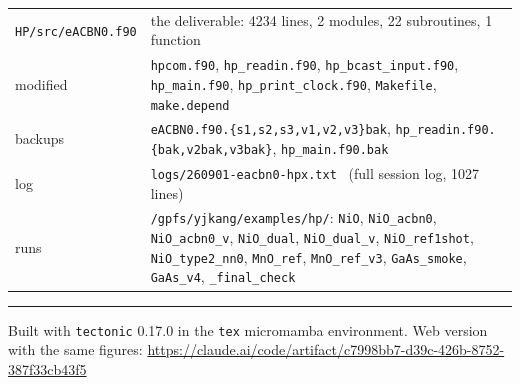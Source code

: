 \documentclass[11pt,a4paper]{article}
\newcommand{\C}[1]{\texttt{\small #1}}
\begin{document}
\begin{center}\small
\begin{tabularx}{\textwidth}{lX}
\toprule
\C{HP/src/eACBN0.f90} & the deliverable: 4234 lines, 2 modules, 22 subroutines, 1 function \\
modified & \C{hpcom.f90}, \C{hp_readin.f90}, \C{hp_bcast_input.f90},
           \C{hp_main.f90}, \C{hp_print_clock.f90}, \C{Makefile},
           \C{make.depend} \\
backups  & \C{eACBN0.f90.\{s1,s2,s3,v1,v2,v3\}bak},
           \C{hp_readin.f90.\{bak,v2bak,v3bak\}}, \C{hp_main.f90.bak} \\
log      & \C{logs/260901-eacbn0-hpx.txt} \ (full session log, 1027 lines) \\
runs     & \C{/gpfs/yjkang/examples/hp/}: \C{NiO}, \C{NiO_acbn0},
           \C{NiO_acbn0_v}, \C{NiO_dual}, \C{NiO_dual_v}, \C{NiO_ref1shot},
           \C{NiO_type2_nn0}, \C{MnO_ref}, \C{MnO_ref_v3}, \C{GaAs_smoke},
           \C{GaAs_v4}, \C{_final_check} \\
\bottomrule
\end{tabularx}
\end{center}

\vspace{6pt}
\noindent\textcolor{rule}{\rule{\textwidth}{0.8pt}}
\vspace{2pt}

\noindent\footnotesize\color{mute}
Built with \texttt{tectonic} 0.17.0 in the \texttt{tex} micromamba environment.
Web version with the same figures:
\url{https://claude.ai/code/artifact/c7998bb7-d39c-426b-8752-387f33cb43f5}
\end{document}
